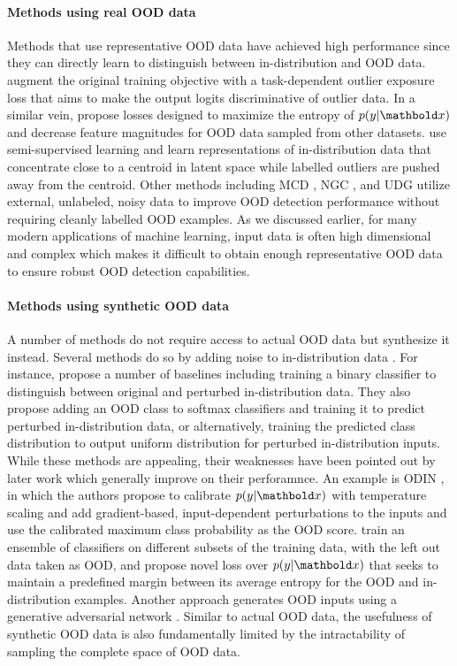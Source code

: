 \paragraph{Methods using real OOD data}
Methods that use representative OOD data have achieved high performance since they can directly learn to distinguish between in-distribution and OOD data. 
\textcite{hendrycks_deep_2019} augment the original training objective with a task-dependent outlier exposure loss that aims to make the output logits discriminative of outlier data. 
In a similar vein, \textcite{dhamija_reducing_2018} propose losses designed to maximize the entropy of $p(y|\xb)$ and decrease feature magnitudes for OOD data sampled from other datasets. 
\textcite{ruff_deep_2020} use semi-supervised learning and learn representations of in-distribution data that concentrate close to a centroid in latent space while labelled outliers are pushed away from the centroid. 
Other methods including MCD \cite{yu_unsupervised_2019}, NGC \cite{wu_ngc_2021}, and UDG \cite{yang_semantically_2021} utilize external, unlabeled, noisy data to improve OOD detection performance without requiring cleanly labelled OOD examples. 
As we discussed earlier, for many modern applications of machine learning, input data is often high dimensional and complex which makes it difficult to obtain enough representative OOD data to ensure robust OOD detection capabilities. 

\paragraph{Methods using synthetic OOD data}
A number of methods do not require access to actual OOD data but synthesize it instead. 
Several methods do so by adding noise to in-distribution data \cite{liang_enhancing_2018, lee_simple_2018, ren_likelihood_2019}. 
For instance, \textcite{ren_likelihood_2019} propose a number of baselines including training a binary classifier to distinguish between original and perturbed in-distribution data. They also propose adding an OOD class to softmax classifiers and training it to predict perturbed in-distribution data, or alternatively, training the predicted class distribution to output uniform distribution for perturbed in-distribution inputs. 
While these methods are appealing, their weaknesses have been pointed out by later work which generally improve on their perforamnce. An example is ODIN \cite{liang_enhancing_2018}, in which the authors propose to calibrate $p(y|\xb)$ with temperature scaling \cite{guo_calibration_2017} and add gradient-based, input-dependent perturbations to the inputs and use the calibrated maximum class probability as the OOD score. 
\textcite{vyas_outofdistribution_2018} train an ensemble of classifiers on different subsets of the training data, with the left out data taken as OOD, and propose novel loss over $p(y|\xb)$ that seeks to maintain a predefined margin between its average entropy for the OOD and in-distribution examples. 
Another approach generates OOD inputs using a generative adversarial network \cite{lee_training_2018}. 
Similar to actual OOD data, the usefulness of synthetic OOD data is also fundamentally limited by the intractability of sampling the complete space of OOD data.


